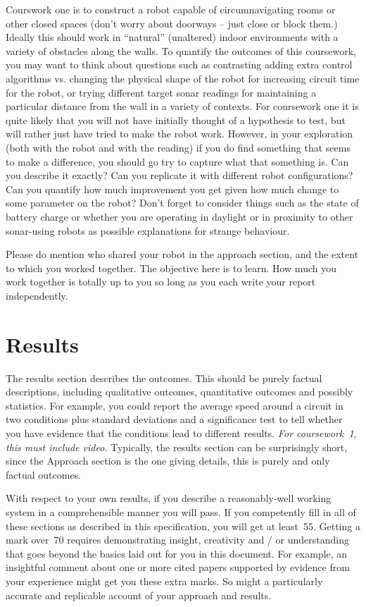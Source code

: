 \documentclass[a4paper,12pt]{article}
\begin{document}
Courswork one is to construct a robot capable of circumnavigating
rooms or other closed spaces (don't worry about doorways -- just close
or block them.)  Ideally this should work in ``natural'' (unaltered) indoor
environments with a variety of obstacles along the walls.  To quantify
the outcomes of this coursework, you may want to think about questions
such as contrasting adding extra control algorithms vs. changing the
physical shape of the robot for increasing circuit time for the robot,
or trying different target sonar readings for maintaining a particular
distance from the wall in a variety of contexts.  For coursework one
it is quite likely that you will not have initially thought of a
hypothesis to test, but will rather just have tried to make the robot
work.  However, in your exploration (both with the robot and with the
reading) if you do find something that seems to make a difference, you
should go try to capture what that something is.  Can you describe it
exactly?  Can you replicate it with different robot configurations?
Can you quantify how much improvement you get given how much change to
some parameter on the robot?  Don't forget to consider things such as
the state of battery charge or whether you are operating in daylight
or in proximity to other sonar-using robots as possible explanations
for strange behaviour.

Please do mention who shared your robot in the approach section, and
the extent to which you worked together.  The objective here is to
learn.  How much you work together is totally up to you so long as you
each write your report independently.

\section{Results}

The results section describes the outcomes.  This should be purely
factual descriptions, including qualitative outcomes, quantitative
outcomes and possibly statistics.  For example, you could report the
average speed around a circuit in two conditions plus standard
deviations and a significance test to tell whether you have evidence
that the conditions lead to different results. {\em For coursework~1, this
must include video.}  Typically, the results section can be
surprisingly short, since the Approach section is the one giving
details, this is purely and only factual outcomes.

With respect to your own results, if you describe a reasonably-well
working system in a comprehensible manner you will pass.  If you
competently fill in all of these sections as described in this
specification, you will get at least~55.  Getting a mark over~70
requires demonstrating insight, creativity and / or understanding that
goes beyond the basics laid out for you in this document.  For
example, an insightful comment about one or more cited papers
supported by evidence from your experience might get you these extra
marks.  So might a particularly accurate and replicable account of
your approach and results.
\end{document}
